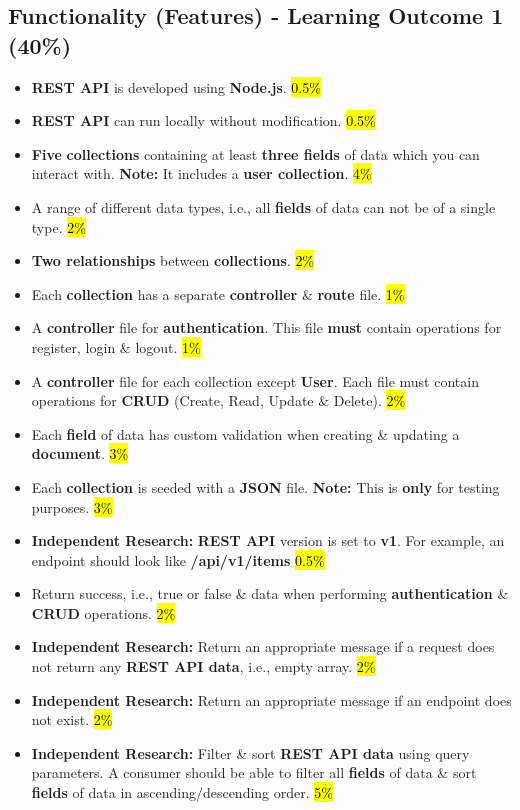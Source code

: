 \documentclass{article}
\begin{document}
\subsection*{Functionality (Features) - Learning Outcome 1 (40\%)}
\begin{itemize}
  \item \textbf{REST API} is developed using \textbf{Node.js}. \hl{0.5\%}
  \item \textbf{REST API} can run locally without modification. \hl{0.5\%}
  \item \textbf{Five} \textbf{collections} containing at least \textbf{three fields} of data which you can interact with. \textbf{Note:} It includes a \textbf{user collection}. \hl{4\%}
  \item A range of different data types, i.e., all \textbf{fields} of data can not be of a single type. \hl{2\%}
  \item \textbf{Two relationships} between \textbf{collections}. \hl{2\%}
  \item Each \textbf{collection} has a separate \textbf{controller} \& \textbf{route} file. \hl{1\%}
  \item A \textbf{controller} file for \textbf{authentication}. This file \textbf{must} contain operations for register, login \& logout. \hl{1\%}
  \item A \textbf{controller} file for each collection except \textbf{User}. Each file must contain operations for \textbf{CRUD} (Create, Read, Update \& Delete). \hl{2\%}
  \item Each \textbf{field} of data has custom validation when creating \& updating a \textbf{document}.  \hl{3\%}
  \item Each \textbf{collection} is seeded with a \textbf{JSON} file. \textbf{Note:} This is \textbf{only} for testing purposes. \hl{3\%}
  \item \textbf{Independent Research:} \textbf{REST API} version is set to \textbf{v1}. For example, an endpoint should look like \textbf{/api/v1/items} \hl{0.5\%}
  \item Return success, i.e., true or false \& data when performing \textbf{authentication} \& \textbf{CRUD} operations. \hl{2\%}
  \item \textbf{Independent Research:} Return an appropriate message if a request does not return any \textbf{REST API data}, i.e., empty array. \hl{2\%}
  \item \textbf{Independent Research:} Return an appropriate message if an endpoint does not exist. \hl{2\%}
  \item \textbf{Independent Research:} Filter \& sort \textbf{REST API data} using query parameters. A consumer should be able to filter all \textbf{fields} of data \& sort \textbf{fields} of data in ascending/descending order. \hl{5\%}

\end{itemize}
\end{document}
